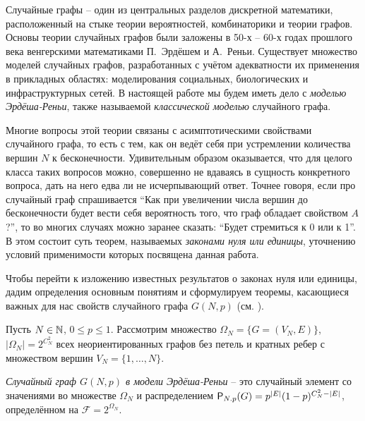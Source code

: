     Случайные графы -- один из центральных разделов дискретной математики, расположенный на стыке теории вероятностей, комбинаторики и теории графов.
    Основы теории случайных графов были заложены в 50-х -- 60-х годах прошлого века венгерскими математиками П.~Эрдёшем и А.~Реньи.
    Существует множество моделей случайных графов, разработанных с учётом адекватности их применения в прикладных областях: моделирования социальных, биологических и инфраструктурных сетей. 
    В настоящей работе мы будем иметь дело с \textit{моделью Эрдёша-Реньи}, также называемой \textit{классической моделью} случайного графа.
    
    Многие вопросы этой теории связаны с асимптотическими свойствами случайного графа, то есть с тем, как он ведёт себя при устремлении количества вершин $N$ к бесконечности.
    Удивительным образом оказывается, что для целого класса таких вопросов можно, совершенно не вдаваясь в сущность конкретного вопроса, дать на него едва ли не исчерпывающий ответ.
    Точнее говоря, если про случайный граф спрашивается ``Как при увеличении числа вершин до бесконечности будет вести себя вероятность того, что граф обладает свойством $A$?'', то во многих случаях можно заранее сказать: ``Будет стремиться к 0 или к 1''.
    В этом состоит суть теорем, называемых \textit{законами нуля или единицы}, уточнению условий применимости которых посвящена данная работа.
    
    Чтобы перейти к изложению известных результатов о законах нуля или единицы, дадим определения основным понятиям и сформулируем теоремы, касающиеся важных для нас свойств случайного графа $G(N,p)$ (см. \cite{survey2015}).
    
    Пусть $N \in \N$, $0 \leq p \leq 1$. Рассмотрим множество $\Omega_N = \{G = (V_N , E)\}$, $|\Omega_N| = 2^{C_N^2}$ всех неориентированных графов без петель и кратных ребер с множеством вершин $V_N = \{1, \ldots, N \}$.
    
    
  \Def \textit{Случайный граф $G(N, p)$  в модели Эрдёша-Реньи} -- это случайный элемент со значениями во множестве $\Omega_N$ и распределением $\P_{N.p}(G) = p^{|E|}(1-p)^{C_N^2-|E|}$, определённом на $\mathscr{F}=2^{\Omega_N}$.
  
